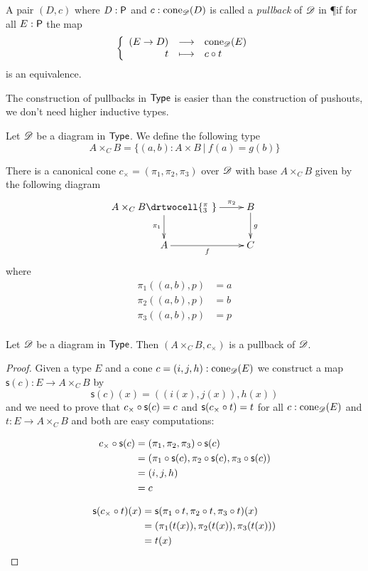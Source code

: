 \begin{defn}
  A pair $(D,c)$ where $D:\P$ and $c:\cone{\Ddiag}{D}$ is called a
  \emph{pullback} of $\Ddiag$ in \P if for all $E:\P$ the map
  \[\function{(E\to{}D)}{\cone{\Ddiag}{E}}{t}{\composecone{t}{c}}\]
  is an equivalence.
\end{defn}

The construction of pullbacks in $\type$ is easier than the construction of
pushouts, we don’t need higher inductive types.

\begin{defn}
  Let $\Ddiag$ be a diagram in $\type$. We define the following type
  \[A\times_CB=\{(a,b):A\times{}B\ |\ f(a) = g(b)\}\]

  There is a canonical cone $c_\times=(\pi_1,\pi_2,\pi_3)$ over $\Ddiag$ with
  base $A\times_CB$ given by the following diagram
  \[\uppercurveobject{{ }}\lowercurveobject{{ }}\twocellhead{{ }}
  \xymatrix{A\times_CB \ar^-{\pi_2}[r] \ar_{\pi_1}[d] \drtwocell{^\pi_3\ }
    & B \ar^g[d] \\ A \ar_f[r] & C}\]
  where
  \begin{align*}
    \pi_1((a,b),p)&=a\\
    \pi_2((a,b),p)&=b\\
    \pi_3((a,b),p)&=p\\
  \end{align*}
\end{defn}

\begin{lem}
  Let $\Ddiag$ be a diagram in $\type$. Then $(A\times_CB,c_\times)$ is a
  pullback of $\Ddiag$.
\end{lem}
\begin{proof}
  Given a type $E$ and a cone $c=(i,j,h):\cone{\Ddiag}{E}$ we construct a map
  $\mathsf{s}(c):E\to{}A\times_CB$ by
  \[\mathsf{s}(c)(x)=((i(x), j(x)), h(x))\]
  and we need to prove that $\composecone{\mathsf{s}(c)}{c_\times}=c$ and
  $\mathsf{s}(\composecone{t}{c_\times})=t$ for all $c:\cone{\Ddiag}{E}$ and
  $t:E\to{}A\times_CB$ and both are easy computations:

  \begin{align*}
    \composecone{\mathsf{s}(c)}{c_\times}
    &=\composecone{\mathsf{s}(c)}{(\pi_1,\pi_2,\pi_3)} \\
    &=(\pi_1\circ\mathsf{s}(c),\pi_2\circ\mathsf{s}(c),
    \pi_3\circ\mathsf{s}(c))\\
    &=(i,j,h)\\
    &=c
  \end{align*}

  \begin{align*}
    \mathsf{s}(\composecone{t}{c_\times})(x) &=
    \mathsf{s}(\pi_1\circ{}t,\pi_2\circ{}t,\pi_3\circ{}t)(x)\\
    &=(\pi_1(t(x)),\pi_2(t(x)),\pi_3(t(x)))\\
    &=t(x)
  \end{align*}
\end{proof}

